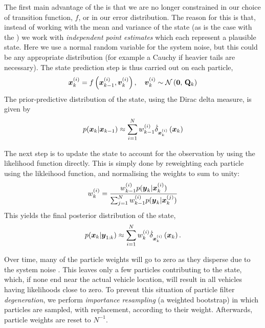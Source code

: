 The first main advantage of the \pf{} is that we are no longer constrained in our choice of transition function, $f$, or in our error distribution. The reason for this is that, instead of working with the mean and variance of the state (as is the case with the \kf{}) we work with \emph{independent point estimates} which each represent a plausible state. Here we use a normal random variable for the system noise, but this could be any appropriate distribution (for example a Cauchy if heavier tails are necessary). The state prediction step is thus carried out on each particle,
\begin{equation}
\label{eq:ch2:pf_predict_particle}
\bx\vi_k = f\left(\bx\vi_{k-1}, \boldsymbol{v}\vi_k\right),
\quad
\boldsymbol{v}\vi_k \sim \Normal{\boldsymbol{0}}{\mat{Q}_k}
\end{equation}
The prior-predictive distribution of the state, using the Dirac delta measure, is given by
\begin{equation}
\label{eq:ch2:pf_predict_state}
p(\bx_k | \bx_{k-1}) \approx
\sum_{i=1}^\Np w\vi_{k-1} \DiracMeasure{\bx\vi_k}{\bx_k}
\end{equation}


The next step is to update the state to account for the observation by using the likelihood function directly. This is simply done by reweighting each particle using the likleihood function, and normalising the weights to sum to unity:
\begin{equation}
\label{eq:pf_reweight}
w\vi_k =
\frac{
    w\vi_{k-1} p(\boldsymbol{y}_k | \bx\vi_k)
}{
    \sum_{j=1}^\Np w\vi_{k-1} p(\boldsymbol{y}_k | \bx\vi[j]_k)
}
\end{equation}
This yields the final posterior distribution of the state,
\begin{equation}
\label{eq:pf_state_post}
p(\bx_{k} | \boldsymbol{y}_{1:k}) \approx
\sum_{i=1}^\Np w\vi_{k} \DiracMeasure{\bx\vi_{k}}{\bx_{k}}.
\end{equation}


Over time, many of the particle weights will go to zero as they disperse due to the system noise \citep{Doucet_2000}. This leaves only a few particles contributing to the state, which, if none end near the actual vehicle location, will result in all vehicles having likelihoods close to zero. To prevent this situation of particle filter \emph{degeneration}, we perform \emph{importance resampling} (a weighted bootstrap) in which particles are sampled, with replacement, according to their weight. Afterwards, particle weights are reset to $N^{-1}$.

